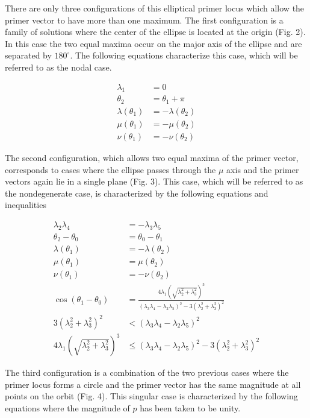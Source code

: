 \documentclass[12pt]{article}
\begin{document}
There are only three configurations of this elliptical primer locus which allow the primer vector to have more than one maximum. The first configuration is a family of solutions where the center of the ellipse is located at the origin (Fig. 2). In this case the two equal maxima occur on the major axis of the ellipse and are separated by $180^\circ$. The following equations characterize this case, which will be referred to as the nodal case.

\begin{align}
\lambda_1 &= 0 \tag{15} \\
\theta_2 &= \theta_1 + \pi \tag{16} \\
\lambda(\theta_1) &= -\lambda(\theta_2) \\
\mu(\theta_1) &= -\mu(\theta_2) \\
\nu(\theta_1) &= -\nu(\theta_2) \tag{17}
\end{align}

The second configuration, which allows two equal maxima of the primer vector, corresponds to cases where the ellipse passes through the $\mu$ axis and the primer vectors again lie in a single plane (Fig. 3). This case, which will be referred to as the nondegenerate case, is characterized by the following equations and inequalities

\begin{align}
\lambda_2 \lambda_4 &= -\lambda_3 \lambda_5 \tag{18} \\
\theta_2 - \theta_0 &= \theta_0 - \theta_1 \tag{19} \\
\lambda (\theta_1) &= -\lambda (\theta_2) \\
\mu (\theta_1) &= \mu (\theta_2) \\
\nu (\theta_1) &= -\nu (\theta_2) \tag{20} \\
\cos (\theta_1 - \theta_0) &= \frac{4 \lambda_1 \left( \sqrt{\lambda_2^2 + \lambda_3^2} \right)^3}{(\lambda_3 \lambda_4 - \lambda_2 \lambda_5)^2 - 3 (\lambda_2^2 + \lambda_3^2)^2} \tag{21} \\
3 (\lambda_2^2 + \lambda_3^2)^2 &< (\lambda_3 \lambda_4 - \lambda_2 \lambda_5)^2 \tag{22} \\
4 \lambda_1 \left( \sqrt{\lambda_2^2 + \lambda_3^2} \right)^3 &\leq (\lambda_3 \lambda_4 - \lambda_2 \lambda_5)^2 - 3 (\lambda_2^2 + \lambda_3^2)^2 \tag{23}
\end{align}

The third configuration is a combination of the two previous cases where the primer locus forms a circle and the primer vector has the same magnitude at all points on the orbit (Fig. 4). This singular case is characterized by the following equations where the magnitude of $p$ has been taken to be unity.
\end{document}
